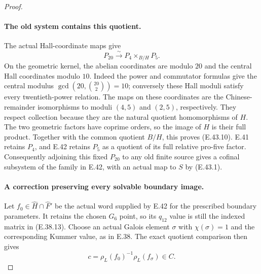 \begin{proof}
\paragraph{The old system contains this quotient.}
The actual Hall-coordinate maps give
\[
 P_{20}\xrightarrow{\sim}
                  P_4\times_{B/H}P_5.
 \tag{E.43.10}
\]
On the geometric kernel, the abelian
coordinates are modulo $20$ and the
central Hall coordinates modulo $10$.
Indeed the power and commutator formulas
give the central modulus
$\gcd(20,\binom{20}{2})=10$;
conversely these Hall moduli satisfy
every twentieth-power relation.
The maps on these coordinates are the
Chinese-remainder isomorphisms to
moduli $(4,5)$ and $(2,5)$, respectively.
They respect collection because they
are the natural quotient homomorphisms
of $H$.  The two geometric factors
have coprime orders, so the image of
$H$ is their full product.  Together
with the common quotient $B/H$, this
proves \textup{(E.43.10)}.
E.41 retains $P_4$, and E.42 retains
$P_5$ as a quotient of its full
relative pro-five factor.
Consequently adjoining this fixed
$P_{20}$ to any old finite source gives
a cofinal subsystem of the family in
E.42, with an actual map to $S$ by
\textup{(E.43.1)}.

\paragraph{A correction preserving every solvable boundary image.}
Let $f_0\in\widehat H\cap\widehat F'$
be the actual word supplied by E.42
for the prescribed boundary parameters.
It retains the chosen $G_6$ point, so
its $q_{12}$ value is still the indexed
matrix in (E.38.13).
Choose an actual Galois element
$\sigma$ with $\chi(\sigma)=1$ and
the corresponding Kummer value, as
in E.38.  The exact quotient comparison
then gives
\[
             c=\rho_L(f_0)^{-1}\rho_L(f_\sigma)\in C.
 \tag{E.43.11}
\]


\end{proof}
